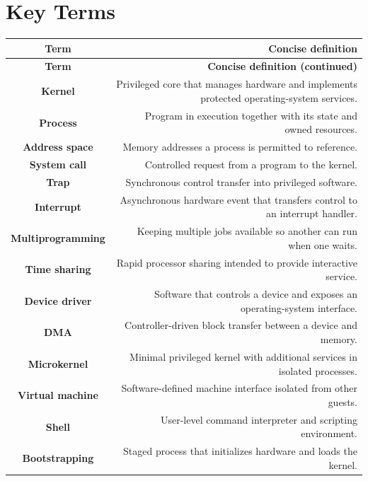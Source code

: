 \documentclass[10pt,letterpaper]{article}
\begin{document}
\section*{Key Terms}
\small
\begin{longtable}{C N}
\color{white}\textbf{Term} & \color{white}\textbf{Concise definition}\\
\endfirsthead
{}\color{white}\textbf{Term} & \color{white}\textbf{Concise definition (continued)}\\
\endhead
\textbf{Kernel} & Privileged core that manages hardware and implements protected operating-system services.\\\hline
\textbf{Process} & Program in execution together with its state and owned resources.\\\hline
\textbf{Address space} & Memory addresses a process is permitted to reference.\\\hline
\textbf{System call} & Controlled request from a program to the kernel.\\\hline
\textbf{Trap} & Synchronous control transfer into privileged software.\\\hline
\textbf{Interrupt} & Asynchronous hardware event that transfers control to an interrupt handler.\\\hline
\textbf{Multiprogramming} & Keeping multiple jobs available so another can run when one waits.\\\hline
\textbf{Time sharing} & Rapid processor sharing intended to provide interactive service.\\\hline
\textbf{Device driver} & Software that controls a device and exposes an operating-system interface.\\\hline
\textbf{DMA} & Controller-driven block transfer between a device and memory.\\\hline
\textbf{Microkernel} & Minimal privileged kernel with additional services in isolated processes.\\\hline
\textbf{Virtual machine} & Software-defined machine interface isolated from other guests.\\\hline
\textbf{Shell} & User-level command interpreter and scripting environment.\\\hline
\textbf{Bootstrapping} & Staged process that initializes hardware and loads the kernel.\\\hline
\end{longtable}
\normalsize
\end{document}
